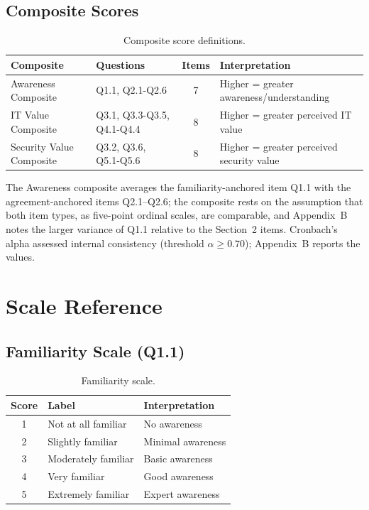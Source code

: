   \subsection{Composite Scores}

  \begin{table}[H]
    \centering
    \caption{Composite score definitions.}
    \label{tab:composite-scores}
    \setlength{\tabcolsep}{5pt}
    \begin{tabular}{@{}llcp{1.6in}@{}}
      \toprule
      \textbf{Composite} & \textbf{Questions} & \textbf{Items} & \textbf{Interpretation} \\
      \midrule
      Awareness Composite & Q1.1, Q2.1-Q2.6 & 7 & Higher = greater awareness/understanding \\
      IT Value Composite & Q3.1, Q3.3-Q3.5, Q4.1-Q4.4 & 8 & Higher = greater perceived IT value \\
      Security Value Composite & Q3.2, Q3.6, Q5.1-Q5.6 & 8 & Higher = greater perceived security value \\
      \bottomrule
    \end{tabular}
  \end{table}

  The Awareness composite averages the familiarity-anchored item Q1.1 with the agreement-anchored items Q2.1--Q2.6; the composite rests on the assumption that both item types, as five-point ordinal scales, are comparable, and Appendix~B notes the larger variance of Q1.1 relative to the Section~2 items. Cronbach's alpha assessed internal consistency (threshold $\alpha \geq 0.70$); Appendix~B reports the values.

  \section{Scale Reference}

  \subsection{Familiarity Scale (Q1.1)}

  \begin{table}[H]
    \centering
    \caption{Familiarity scale.}
    \label{tab:familiarity-scale}
    \begin{tabular}{@{}cll@{}}
      \toprule
      \textbf{Score} & \textbf{Label} & \textbf{Interpretation} \\
      \midrule
      1 & Not at all familiar & No awareness \\
      2 & Slightly familiar & Minimal awareness \\
      3 & Moderately familiar & Basic awareness \\
      4 & Very familiar & Good awareness \\
      5 & Extremely familiar & Expert awareness \\
      \bottomrule
    \end{tabular}
  \end{table}

